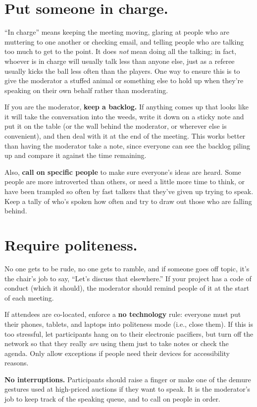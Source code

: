 \documentclass[10pt,letterpaper]{article}
\newcommand{\rulemajor}[1]{\section{#1}}
\begin{document}
\rulemajor{Put someone in charge.}

``In charge'' means keeping the meeting moving, glaring at people who are
muttering to one another or checking email, and telling people who are talking
too much to get to the point.  It does \emph{not} mean doing all the talking; in
fact, whoever is in charge will usually talk less than anyone else, just as a
referee usually kicks the ball less often than the players.  One way to ensure
this is to give the moderator a stuffed animal or something else to hold up when
they're speaking on their own behalf rather than moderating.

If you are the moderator, \textbf{keep a backlog.}  If anything comes up that
looks like it will take the conversation into the weeds, write it down on a
sticky note and put it on the table (or the wall behind the moderator, or
wherever else is convenient), and then deal with it at the end of the meeting.
This works better than having the moderator take a note, since everyone can see
the backlog piling up and compare it against the time remaining.

Also, \textbf{call on specific people} to make sure everyone's ideas are heard.
Some people are more introverted than others, or need a little more time to
think, or have been trampled so often by fast talkers that they've given up
trying to speak. Keep a tally of who's spoken how often and try to draw out
those who are falling behind.

\rulemajor{Require politeness.}

No one gets to be rude, no one gets to ramble, and if someone goes off topic,
it's the chair's job to say, ``Let's discuss that elsewhere.''  If your project
has a code of conduct (which it should), the moderator should remind people of
it at the start of each meeting.

If attendees are co-located, enforce a \textbf{no technology} rule: everyone
must put their phones, tablets, and laptops into politeness mode (i.e., close
them).  If this is too stressful, let participants hang on to their electronic
pacifiers, but turn off the network so that they really \emph{are} using them
just to take notes or check the agenda.  Only allow exceptions if people need
their devices for accessibility reasons.

\textbf{No interruptions.}  Participants should raise a finger or make one of
the demure gestures used at high-priced auctions if they want to speak. It is
the moderator's job to keep track of the speaking queue, and to call on people
in order.
\end{document}
